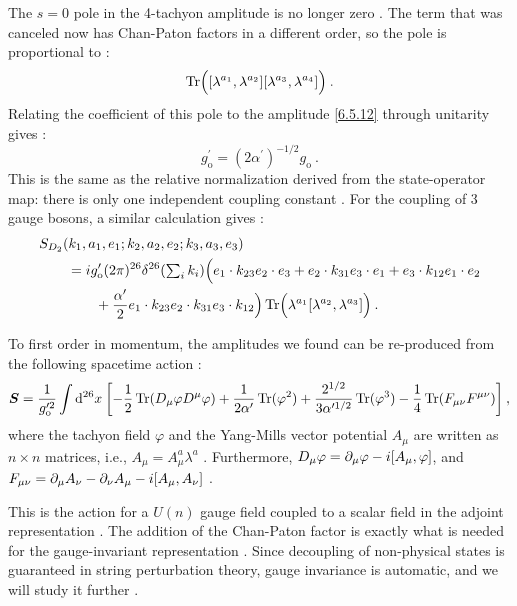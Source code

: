 The $s=0$ pole in the 4-tachyon amplitude is no longer zero . The term that was canceled now has Chan-Paton factors in a different order, so the pole is proportional to :
\begin{equation}
	\operatorname{Tr}\Bigl([\lambda^{a_{1}}, \lambda^{a_{2}}][\lambda^{a_{3}}, \lambda^{a_{4}}]\Bigr) \:. \label{6.5.13}
\end{equation}
Relating the coefficient of this pole to the amplitude \eqref{6.5.12} through unitarity gives :
\begin{equation}
	g_{\mathrm{o}}^{\prime}=(2 \alpha^{\prime})^{-1 / 2} g_{\mathrm{o}} \:. \label{6.5.14}
\end{equation}
This is the same as the relative normalization derived from the state-operator map: there is only one independent coupling constant . For the coupling of 3 gauge bosons, a similar calculation gives :
\begin{align}
	&S_{D_{2}}(k_{1}, a_{1}, e_{1} ; k_{2}, a_{2}, e_{2} ; k_{3}, a_{3}, e_{3}) \nonumber \\
	&\qquad = i g_{\mathrm{o}}^{\prime}(2 \pi)^{26} \delta^{26}({\textstyle\sum_{i} k_{i}})
	\Bigl(e_{1} \cdot k_{23} e_{2} \cdot e_{3}+e_{2} \cdot k_{31} e_{3} \cdot e_{1}+e_{3} \cdot k_{12} e_{1} \cdot e_{2} \nonumber\\
	&\qquad \qquad +\frac{\alpha^{\prime}}{2} e_{1} \cdot k_{23} e_{2} \cdot k_{31} e_{3} \cdot k_{12} \Bigr) 
	\operatorname{Tr}\Bigl(\lambda^{a_{1}}[\lambda^{a_{2}}, \lambda^{a_{3}}]\Bigr) \:. \label{6.5.15}
\end{align}

To first order in momentum, the amplitudes we found can be re-produced from the following spacetime action :
\begin{equation}
	\bm{S}=\frac{1}{g_{\mathrm{o}}^{\prime 2}} \int \mathrm{d}^{26} x\: \biggl[-\frac{1}{2} \operatorname{Tr}(D_{\mu} \varphi D^{\mu}\varphi)+\frac{1}{2 \alpha^{\prime}} \operatorname{Tr}(\varphi^{2})+\frac{2^{1 / 2}}{3 \alpha^{\prime 1 / 2}} 
	\operatorname{Tr}(\varphi^{3})
	-\frac{1}{4} \operatorname{Tr}(F_{\mu \nu} F^{\mu \nu})\biggr] \:, \label{6.5.16}
\end{equation}
where the tachyon field $\varphi$ and the Yang-Mills vector potential $A_{\mu}$ are written as $n \times n$ matrices, i.e., $A_{\mu}=A_{\mu}^{a} \lambda^{a}$ . Furthermore, $D_{\mu} \varphi=\partial_{\mu} \varphi-i[A_{\mu}, \varphi]$, and $F_{\mu \nu}=\partial_{\mu} A_{\nu}-\partial_{\nu} A_{\mu}-i[A_{\mu}, A_{\nu}]$ .

This is the action for a $U(n)$ gauge field coupled to a scalar field in the adjoint representation . The addition of the Chan-Paton factor is exactly what is needed for the gauge-invariant representation . Since decoupling of non-physical states is guaranteed in string perturbation theory, gauge invariance is automatic, and we will study it further .

